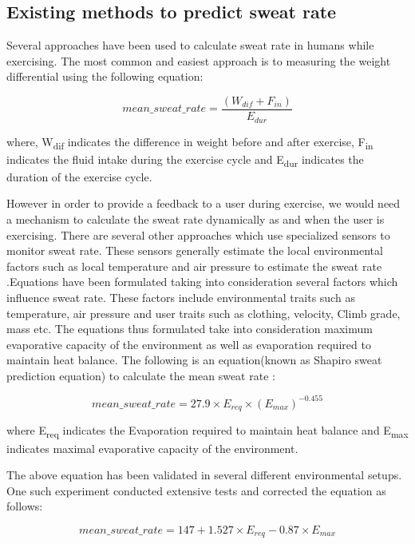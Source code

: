 \documentclass[conference]{IEEEtran}
\begin{document}
\subsection{Existing methods to predict sweat rate}

Several approaches have been used to calculate sweat rate in humans while exercising. The most common and easiest approach is to measuring the weight differential using the following equation:

\begin{equation}
mean\_sweat\_rate=\dfrac{(W_{dif}+F_{in})}{E_{dur}}
\end{equation}

where, W\textsubscript{dif} indicates the difference in weight before and after exercise, F\textsubscript{in} indicates the fluid intake during the exercise cycle and E\textsubscript{dur} indicates the duration of the exercise cycle.

 However in order to provide a feedback to a user during exercise, we would need a mechanism to calculate the sweat rate dynamically as and when the user is exercising. There are several other approaches which use specialized sensors to monitor sweat rate. These sensors generally estimate the local environmental factors such as local temperature and air pressure to estimate the sweat rate \cite{sweat2}.Equations have been formulated taking into consideration several factors which influence sweat rate. These factors include environmental traits such as temperature, air pressure and user traits such as clothing, velocity, Climb grade, mass etc. The equations thus formulated take into consideration maximum evaporative capacity of the environment as well as evaporation required to maintain heat balance. The following is an equation(known as Shapiro sweat prediction equation) to calculate the mean sweat rate \cite{sweat3}:

\begin{equation}
mean\_sweat\_rate = 27.9 \times E_{req} \times (E_{max})^{-0.455}
\end{equation}

where E\textsubscript{req} indicates the Evaporation required to maintain heat balance and E\textsubscript{max} indicates maximal evaporative capacity of the environment.

The above equation has been validated in several different environmental setups. One such experiment conducted extensive tests \cite{sweat4} and corrected the equation as follows:

\begin{equation}
mean\_sweat\_rate = 147+1.527 \times E_{req}-0.87 \times E_{max}
\end{equation}
\end{document}
